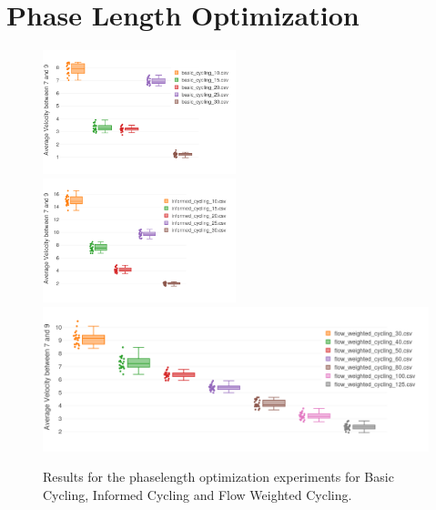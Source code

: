 \documentclass[11pt]{article}
\begin{document}
\section{Phase Length Optimization}
\nopagebreak
\begin{figure}[h!]
	\includegraphics[width=0.5\textwidth]{img/basic-opt.png}
	\includegraphics[width=0.5\textwidth]{img/informed-opt.png}
	\includegraphics[width=\textwidth]{img/flow-opt.png}
	\caption{Results for the phaselength optimization experiments for Basic Cycling, Informed Cycling and Flow Weighted Cycling. \label{fig:opt-results}}
\end{figure}
\end{document}
